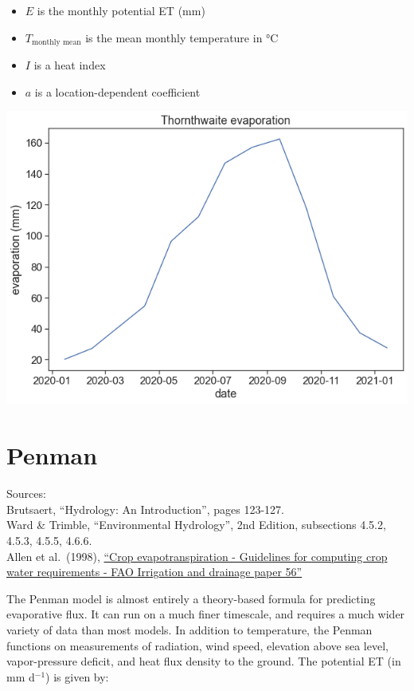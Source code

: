 \documentclass[
  letterpaper,
  DIV=11,
  numbers=noendperiod]{scrreprt}
\providecommand{\tightlist}{%
  \setlength{\itemsep}{0pt}\setlength{\parskip}{0pt}}\usepackage{longtable,booktabs,array}
\begin{document}
\begin{itemize}
\tightlist
\item
  \(E\) is the monthly potential ET (mm)
\item
  \(T_\text{monthly mean}\) is the mean monthly temperature in °C
\item
  \(I\) is a heat index
\item
  \(a\) is a location-dependent coefficient
\end{itemize}

\includegraphics{archive/figures/th-et.png}

\hypertarget{penman}{%
\section{Penman}\label{penman}}

Sources:\\
Brutsaert, ``Hydrology: An Introduction'', pages 123-127.\\
Ward \& Trimble, ``Environmental Hydrology'', 2nd Edition, subsections
4.5.2, 4.5.3, 4.5.5, 4.6.6.\\
Allen et al.~(1998),
\href{http://www.fao.org/3/x0490e/x0490e07.htm\#chapter\%203\%20\%20\%20meteorological\%20data}{``Crop
evapotranspiration - Guidelines for computing crop water requirements -
FAO Irrigation and drainage paper 56''}

The Penman model is almost entirely a theory-based formula for
predicting evaporative flux. It can run on a much finer timescale, and
requires a much wider variety of data than most models. In addition to
temperature, the Penman functions on measurements of radiation, wind
speed, elevation above sea level, vapor-pressure deficit, and heat flux
density to the ground. The potential ET (in mm d\(^{-1}\)) is given by:
\end{document}
